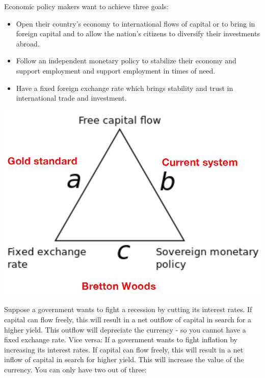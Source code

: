 \begin{minipage}{0.55\textwidth}
    Economic policy makers want to achieve three goals:
    \begin{itemize}
        \item Open their country's economy to international flows of capital
            or to bring in foreign capital and to allow the nation's citizens
            to diversify their investments abroad.
        \item Follow an independent monetary policy to stabilize their economy
            and support employment and support employment in times of need.
        \item Have a fixed foreign exchange rate which brings stability and
            trust in international trade and investment.
    \end{itemize}
\end{minipage}
\hspace{10pt}
\begin{minipage}{0.4\textwidth}
    \includegraphics[width=\textwidth]{Pictures/trilemma.png}
\end{minipage}

\vspace{1\baselineskip}

Suppose a government wants to fight a recession by cutting its interest rates.
If capital can flow freely, this will result in a net outflow of capital in
search for a higher yield. This outflow will depreciate the currency - so you
cannot have a fixed exchange rate. Vice versa: If a government wants to fight
inflation by increasing its interest rates. If capital can flow freely, this
will result in a net inflow of capital in search for higher yield. This will
increase the value of the currency. You can only have two out of three:

